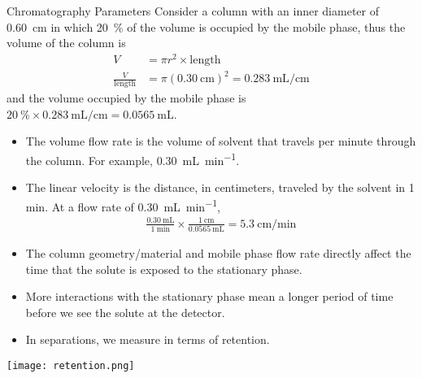 \documentclass[notes=only]{beamer}
\begin{document}
\begin{frame}[allowframebreaks=1]{Chromatography Parameters}
	Consider a column with an inner diameter of \SI{0.60}{\cm} in which
	\SI{20}{\percent} of the volume is occupied by
	the mobile phase, thus the volume of the column is
	\begin{align*}
		V &= \pi r^2 \times \text{length} \\
		\frac{V}{\text{length}} &= \pi (\SI{0.30}{\cm})^2 =
		\SI{0.283}{\mL\per\cm}
	\end{align*}
	and the volume occupied by the mobile phase is $
		\SI{20}{\percent} \times \SI{0.283}{\mL\per\cm} =
		\SI{0.0565}{\mL}$.

		\framebreak

	\begin{itemize}
		\item The \alert{volume flow rate} is the volume of
			solvent that travels per minute through the
			column. For example, \SI{0.30}{\mL\per\minute}.
		\item The \alert{linear velocity} is the distance, in
			centimeters, traveled by the solvent in 1 min.
			At a flow rate of \SI{0.30}{\mL\per\minute},
			\begin{align*}
				\frac{\SI{0.30}{\mL}}{\SI{1}{\minute}}
				\times
				\frac{\SI{1}{\cm}}{\SI{0.0565}{\mL}} =
				\SI{5.3}{\cm\per\minute}
			\end{align*}
	\end{itemize}

	\framebreak
	
	\begin{itemize}
		\item The column geometry/material and mobile phase flow rate
			directly affect the \alert{time} that the solute is
			exposed to the stationary phase.
		\item \alert{More} interactions with the stationary phase mean a
			\alert{longer} period of time before we see the solute
			at the detector.
		\item In separations, we measure in terms of \alert{retention}.
	\end{itemize}
	
	\begin{center}
		\texttt{[image: retention.png]}
	\end{center}
\end{frame}
\end{document}
